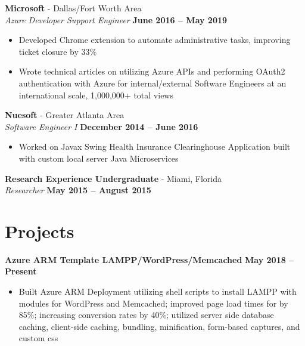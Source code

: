 \documentclass[margin,line]{resume}
\begin{document}
\begin{resume}
	\textbf{Microsoft} - Dallas/Fort Worth Area\vspace{1mm}\\\vspace{1mm}
	\textsl{Azure Developer Support Engineer} \hfill \textbf{June 2016 -- May 2019}
	\begin{itemize}
		 \item Developed Chrome extension to automate administrative tasks, improving ticket closure by 33\%
		 \item Wrote technical articles on utilizing Azure APIs and performing OAuth2 authentication with Azure for internal/external Software Engineers at an international scale, 1,000,000+ total views
	
	\end{itemize}

	\textbf{Nuesoft} - Greater Atlanta Area \vspace{1mm}\\\vspace{1mm}%
	\textsl{Software Engineer I} \hfill \textbf{December 2014 -- June 2016}
	\begin{itemize}
	 	\item Worked on Javax Swing Health Insurance Clearinghouse Application built with custom local server Java Microservices
	\end{itemize}

	\textbf{Research Experience Undergraduate} - Miami, Florida \vspace{1mm}\\\vspace{1mm}%
	\textsl{Researcher} \hfill \textbf{May 2015 -- August 2015}
	
	
	\section{\mysidestyle Projects}
	
	\textbf{Azure ARM Template LAMPP/WordPress/Memcached}  \hfill \textbf{May 2018 -- Present}
	\vspace{1mm}
	\begin{itemize}
		\item Built Azure ARM Deployment utilizing shell scripts to install LAMPP with modules for WordPress and Memcached; improved page load times for by 85\%; increasing conversion rates by 40\%; utilized server side database caching, client-side caching, bundling, minification, form-based captures, and custom css
	\end{itemize}
	

\end{resume}
\end{document}
